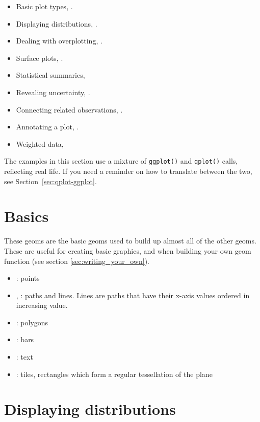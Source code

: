 \begin{itemize}
  \item Basic plot types, .
  \item Displaying distributions, .
  \item Dealing with overplotting, .
  \item Surface plots, .
  \item Statistical summaries, 
  \item Revealing uncertainty, .
  \item Connecting related observations, .
  \item Annotating a plot, .
  \item Weighted data, 
\end{itemize}

The examples in this section use a mixture of {\tt ggplot()} and {\tt qplot()} calls, reflecting real life.  If you need a reminder on how to translate between the two, see Section~\ref{sec:qplot-ggplot}.

\section{Basics}\label{sec:basics}

These geoms are the basic geoms used to build up almost all of the other geoms.  These are useful for creating basic graphics, and when building your own geom function (see section \ref{sec:writing_your_own}).

\begin{itemize}
  \item {}: points
  \item {}, : paths and lines.  Lines are paths that have their x-axis values ordered in increasing value.
  \item {}: polygons
  \item {}: bars
  \item {}: text
  \item {}: tiles, rectangles which form a regular tessellation of the plane
\end{itemize}

\section{Displaying distributions}\label{sec:distributions}

